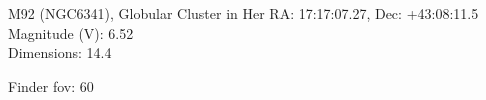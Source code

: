 \begin{block}{M92 (NGC6341), Globular Cluster in Her}
    RA: 17:17:07.27, Dec: +43:08:11.5 \\ 
    Magnitude (V): 6.52 \\ 
    Dimensions: 14.4 

    Finder fov: 60 
\end{block}